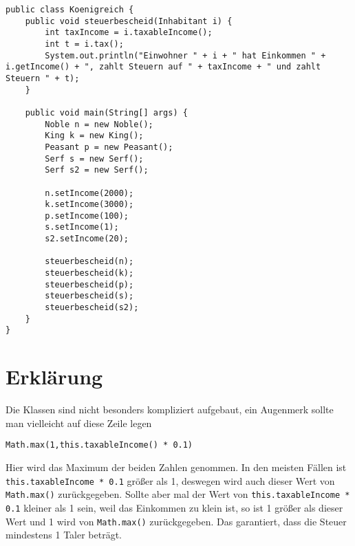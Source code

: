 \documentclass{article}
\begin{document}
	\begin{lstlisting}[style=java,tabsize=2]
public class Koenigreich {
	public void steuerbescheid(Inhabitant i) {
		int taxIncome = i.taxableIncome();
		int t = i.tax();
		System.out.println("Einwohner " + i + " hat Einkommen " + i.getIncome() + ", zahlt Steuern auf " + taxIncome + " und zahlt Steuern " + t);
	}

	public void main(String[] args) {
		Noble n = new Noble();
		King k = new King();
		Peasant p = new Peasant();
		Serf s = new Serf();
		Serf s2 = new Serf();

		n.setIncome(2000);
		k.setIncome(3000);
		p.setIncome(100);
		s.setIncome(1);
		s2.setIncome(20);

		steuerbescheid(n);
		steuerbescheid(k);
		steuerbescheid(p);
		steuerbescheid(s);
		steuerbescheid(s2);
	}
}
	\end{lstlisting}

	\section*{Erklärung}
	Die Klassen sind nicht besonders kompliziert aufgebaut, ein Augenmerk sollte man vielleicht auf diese Zeile legen
	\begin{lstlisting}[style=java]
Math.max(1,this.taxableIncome() * 0.1)
	\end{lstlisting}
	Hier wird das Maximum der beiden Zahlen genommen. In den meisten Fällen ist \texttt{this.taxableIncome * 0.1} größer als 1, deswegen wird auch dieser Wert von \texttt{Math.max()} zurückgegeben. Sollte aber mal der Wert von  \texttt{this.taxableIncome * 0.1} kleiner als 1 sein, weil das Einkommen zu klein ist, so ist 1 größer als dieser Wert und 1 wird von \texttt{Math.max()} zurückgegeben. Das garantiert, dass die Steuer mindestens 1 Taler beträgt.
	
\end{document}
